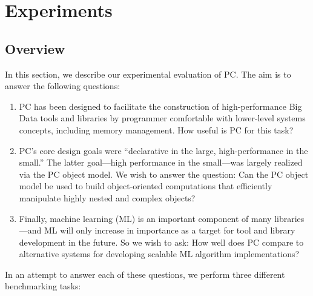 
\section{Experiments}
\label{sec:exp}
\subsection{Overview}

In this section, we describe our experimental evaluation of PC.
The aim is to answer
the following questions:

\begin {enumerate}
\item PC has been designed to facilitate the construction of high-performance Big Data tools and libraries by programmer
comfortable with lower-level systems concepts, including memory management.
How useful is PC for this task?
\item PC's core design goals were ``declarative in the large,
high-performance in the small.'' The latter goal---high performance in the small---was largely realized via the 
PC object model.  We wish to answer the question: Can the PC object model be used to build 
object-oriented computations
that efficiently manipulate highly nested and complex objects?
\item Finally, machine learning (ML) is an important component of many libraries---and ML will only increase in importance
as a target for tool and library development in the future.
So we wish to ask: How well does PC compare to alternative systems for developing scalable ML algorithm implementations?
\end {enumerate}

\noindent In an attempt to answer each of these questions, we perform three different benchmarking tasks:

